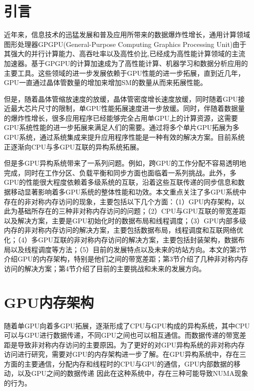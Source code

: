 \documentclass{cjc}
\begin{document}
\maketitle


\section{引言}

近年来，信息技术的迅猛发展和普及应用所带来的数据爆炸性增长，通用计算领域图形处理器GPGPU(General-Purpose Computing Graphics Processing Unit)由于其强大的并行计算能力、高吞吐率以及高性价比,已经成为高性能计算领域的主流加速器。基于GPGPU的计算加速成为了高性能计算、机器学习和数据分析应用的主要工具。这些领域的进一步发展依赖于GPU性能的进一步拓展，直到近几年，GPU一直通过晶体管数量的增加来增加SM的数量从而来拓展性能。

但是，随着晶体管缩放速度的放缓，晶体管密度增长速度放缓，同时随着GPU接近最大芯片尺寸的限制，单GPU性能拓展速度进一步放缓。同时，伴随着数据量的爆炸性增长，很多应用程序已经能够完全占用单GPU上的计算资源，这需要GPU系统性能的进一步拓展来满足人们的需要。通过将多个单片GPU拓展为多GPU系统，通过系统集成来提升应用程序性能是一种有效的解决方案。目前系统正逐渐向CPU与多GPU互联的异构系统拓展。

但是多GPU异构系统带来了一系列问题。例如，跨GPU的工作分配不容易透明地完成，同时在工作分区、负载平衡和同步方面也面临着一系列挑战。此外，多GPU的性能很大程度依赖着多级系统的互联，沿着这些互联传递的同步信息和数据移动显著影响着多GPU系统的整体性能和功效。本文重点关注了多GPU系统中存在的非对称内存访问的现象，主要包括以下几个方面：（1）GPU内存架构，以此为基础所存在的三种非对称内存访问的问题；（2）CPU与GPU互联的带宽差距以及解决方案，主要是GPU初始化时的数据布局和线程调度；（3）GPU内部多级内存的非对称内存访问的解决方案，主要包括数据布局，线程调度和互联网络优化；（4）多GPU互联的非对称内存访问的解决方案，主要包括封装架构，数据布局以及线程调度等方法；（5）目前的发展特点以及未来的坊站方向。本文的第2节介绍GPU的内存架构，特别是他们之间的带宽差距；第3节介绍了几种非对称内存访问的解决方案；第4节介绍了目前的主要挑战和未来的发展方向。

\section{GPU内存架构}

随着单GPU向着多GPU拓展，逐渐形成了CPU与GPU构成的异构系统，其中CPU可以与GPU进行数据传递，不同GPU之间也可以相互通信。而数据传递的带宽差距是导致非对称内存访问的主要原因。为了更好的对GPU异构系统的非对称内存访问进行研究，需要对GPU的内存架构进一步了解。在GPU异构系统中，存在三方面的主要通信，分配内存和线程时的CPU与GPU的通信，GPU内部数据的移动，以及GPU之间的数据传递
因此在这种系统中，存在三种可能导致NUMA现象的行为。
\end{document}
